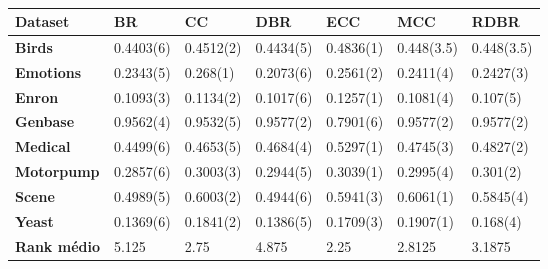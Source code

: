 \begin{table}[\tabmode]
\begin{tabular}{lllllll}
\hline
\textbf{Dataset} & \textbf{BR} & \textbf{CC} & \textbf{DBR} & \textbf{ECC} & \textbf{MCC} & \textbf{RDBR} \\ \hline
\textbf{Birds}           & 0.4403(6)   & 0.4512(2)   & 0.4434(5)    & 0.4836(1)    & 0.448(3.5)   & 0.448(3.5)    \\
\textbf{Emotions}        & 0.2343(5)   & 0.268(1)    & 0.2073(6)    & 0.2561(2)    & 0.2411(4)    & 0.2427(3)     \\
\textbf{Enron}           & 0.1093(3)   & 0.1134(2)   & 0.1017(6)    & 0.1257(1)    & 0.1081(4)    & 0.107(5)      \\
\textbf{Genbase}         & 0.9562(4)   & 0.9532(5)   & 0.9577(2)    & 0.7901(6)    & 0.9577(2)    & 0.9577(2)     \\
\textbf{Medical}         & 0.4499(6)   & 0.4653(5)   & 0.4684(4)    & 0.5297(1)    & 0.4745(3)    & 0.4827(2)     \\
\textbf{Motorpump}       & 0.2857(6)   & 0.3003(3)   & 0.2944(5)    & 0.3039(1)    & 0.2995(4)    & 0.301(2)      \\
\textbf{Scene}           & 0.4989(5)   & 0.6003(2)   & 0.4944(6)    & 0.5941(3)    & 0.6061(1)    & 0.5845(4)     \\
\textbf{Yeast}           & 0.1369(6)   & 0.1841(2)   & 0.1386(5)    & 0.1709(3)    & 0.1907(1)    & 0.168(4)      \\ \hline
\textbf{Rank médio}      & 5.125       & 2.75        & 4.875        & 2.25         & 2.8125       & 3.1875        \\ \hline
\end{tabular}
\caption{}
\label{tab:SAlogi}
\end{table}